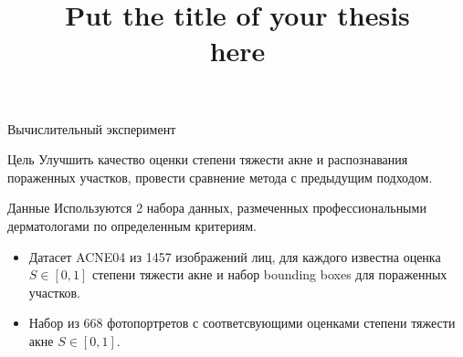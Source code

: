 \documentclass[12pt,pdf,hyperref={unicode}]{beamer}
\title{ Put the title of your thesis \\ here}
\begin{document}
\setcounter{page}{4}%
\begin{frame}{Вычислительный эксперимент}
\begin{block}{Цель}
Улучшить качество оценки степени тяжести акне и распознавания пораженных участков, провести сравнение метода с предыдущим подходом.
\end{block}
\begin{block}{Данные}
Используются 2 набора данных, размеченных профессиональными дерматологами по определенным критериям.
\begin{itemize}
    \item Датасет ACNE04 из 1457 изображений лиц, для каждого известна оценка $S \in [0, 1]$ степени тяжести акне и набор bounding boxes для пораженных участков.
    \item Набор из 668 фотопортретов с соответсвующими оценками степени тяжести акне $S \in [0, 1]$.
\end{itemize}
\end{block}
\end{frame}
\end{document}
